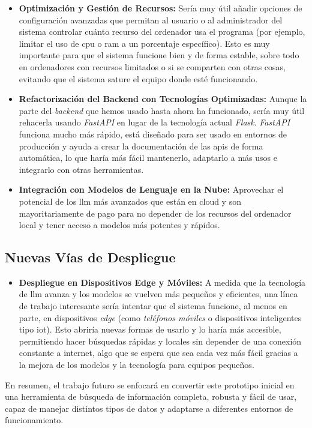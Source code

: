\begin{itemize}
    \item \textbf{Optimización y Gestión de Recursos:} Sería muy útil añadir opciones de configuración avanzadas que permitan al usuario o al administrador del sistema controlar cuánto recurso del ordenador usa el programa (por ejemplo, limitar el uso de \gls{cpu} o \gls{ram} a un porcentaje específico). Esto es muy importante para que el sistema funcione bien y de forma estable, sobre todo en ordenadores con recursos limitados o si se comparten con otras cosas, evitando que el sistema sature el equipo donde esté funcionando.
    \item \textbf{Refactorización del Backend con Tecnologías Optimizadas:} Aunque la parte del \textit{backend} que hemos usado hasta ahora ha funcionado, sería muy útil rehacerla usando \textit{FastAPI} en lugar de la tecnología actual \textit{Flask}. \textit{FastAPI} funciona mucho más rápido, está diseñado para ser usado en entornos de producción y ayuda a crear la documentación de las \gls{api}s de forma automática, lo que haría más fácil mantenerlo, adaptarlo a más usos e integrarlo con otras herramientas.
    \item \textbf{Integración con Modelos de Lenguaje en la Nube:} Aprovechar el potencial de los \gls{llm} más avanzados que están en cloud y son mayoritariamente de pago para no depender de los recursos del ordenador local y tener acceso a modelos más potentes y rápidos.
\end{itemize}

\subsection{Nuevas Vías de Despliegue}

\begin{itemize}
    \item \textbf{Despliegue en Dispositivos Edge y Móviles:} A medida que la tecnología de \gls{llm} avanza y los modelos se vuelven más pequeños y eficientes, una línea de trabajo interesante sería intentar que el sistema funcione, al menos en parte, en dispositivos \textit{edge} (como \textit{teléfonos móviles} o dispositivos inteligentes tipo \gls{iot}). Esto abriría nuevas formas de usarlo y lo haría más accesible, permitiendo hacer búsquedas rápidas y locales sin depender de una conexión constante a internet, algo que se espera que sea cada vez más fácil gracias a la mejora de los modelos y la tecnología para equipos pequeños.
\end{itemize}

En resumen, el trabajo futuro se enfocará en convertir este prototipo inicial en una herramienta de búsqueda de información completa, robusta y fácil de usar, capaz de manejar distintos tipos de datos y adaptarse a diferentes entornos de funcionamiento.

